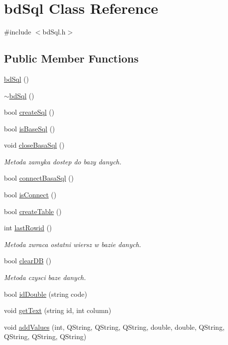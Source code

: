 \hypertarget{classbd_sql}{}\section{bd\+Sql Class Reference}
\label{classbd_sql}


{\ttfamily \#include $<$bd\+Sql.\+h$>$}

\subsection*{Public Member Functions}
\begin{DoxyCompactItemize}
\item 
\mbox{\hyperlink{classbd_sql_a05c6da7edc08d18ed053427bcf850a7e}{bd\+Sql}} ()
\item 
\mbox{\hyperlink{classbd_sql_a14a73f3109cf0ac6e1cabc98e31b7afe}{$\sim$bd\+Sql}} ()
\item 
bool \mbox{\hyperlink{classbd_sql_a578d57e681bdbfda8a324e35910ce24f}{create\+Sql}} ()
\item 
bool \mbox{\hyperlink{classbd_sql_a0b7a0441d1a99d70f6511eb0d8022399}{is\+Base\+Sql}} ()
\item 
void \mbox{\hyperlink{classbd_sql_a0adf199bdaad8c61402b15e2a42578a2}{close\+Basa\+Sql}} ()
\begin{DoxyCompactList}\small\item\em Metoda zamyka dostep do bazy danych. \end{DoxyCompactList}\item 
bool \mbox{\hyperlink{classbd_sql_a9da02a1aaec248a01a337e04dd89c0ec}{connect\+Basa\+Sql}} ()
\item 
bool \mbox{\hyperlink{classbd_sql_a18c28038b8b6171287e045b5bf5afd65}{is\+Connect}} ()
\item 
bool \mbox{\hyperlink{classbd_sql_a7868146c7d38dd16dd6b9f2934af109c}{create\+Table}} ()
\item 
int \mbox{\hyperlink{classbd_sql_a016360cb80604552be1cd1af1d210d7c}{last\+Rowid}} ()
\begin{DoxyCompactList}\small\item\em Metoda zwraca ostatni wiersz w bazie danych. \end{DoxyCompactList}\item 
bool \mbox{\hyperlink{classbd_sql_a86cd5eb2507cb591fdeed30506796681}{clear\+DB}} ()
\begin{DoxyCompactList}\small\item\em Metoda czysci baze danych. \end{DoxyCompactList}\item 
bool \mbox{\hyperlink{classbd_sql_a6e9a3dd4c88f9b7173578d4e89a9c882}{id\+Double}} (string code)
\item 
void \mbox{\hyperlink{classbd_sql_ac9e239ec1308af48b936e9750f8d3bfa}{get\+Text}} (string id, int column)
\item 
void \mbox{\hyperlink{classbd_sql_a1caa0d6598b68db4c5f7148a62072990}{add\+Values}} (int, Q\+String, Q\+String, Q\+String, double, double, Q\+String, Q\+String, Q\+String, Q\+String)
\end{DoxyCompactItemize}
